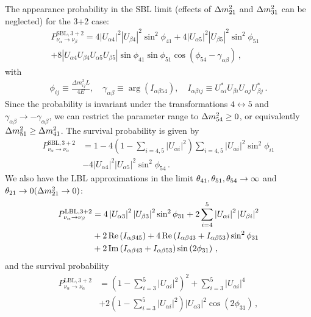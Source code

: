 \documentclass[twocolumn]{article}
\renewcommand{\a}{\ensuremath{\alpha}}
\renewcommand{\b}{\ensuremath{\beta}}
\renewcommand{\th}[1][]{%
  \theta\ifx\\#1\\\else_\text{#1}\fi
}
\newcommand*{\dm}[1][]{%
  \Delta m^2\ifx\\#1\\\else_\text{#1}\fi
}
\begin{document}
The appearance probability in the SBL limit (effects of $\dm[21]$ and $\dm[31]$ can be neglected) for the 3+2 case:
\begin{align*}
  P_{\nu_{\alpha} \rightarrow \nu_{\beta}}^{\mathrm{SBL}, 3+2}=4\left|U_{\alpha 4}\right|^{2}\left|U_{\beta 4}\right|^{2} \sin ^{2} \phi_{41}+4\left|U_{\alpha 5}\right|^{2}\left|U_{\beta 5}\right|^{2} \sin ^{2} \phi_{51} & \\
  +8\left|U_{\alpha 4} U_{\beta 4} U_{\alpha 5} U_{\beta 5}\right| \sin \phi_{41} \sin \phi_{51} \cos \left(\phi_{54}-\gamma_{\alpha \beta}\right)
\,,\end{align*}
with 
\begin{align*}
  \phi_{i j} \equiv \frac{\Delta m_{i j}^{2} L}{4 E}, \quad \gamma_{\alpha \beta} \equiv \arg \left(I_{\alpha \beta 54}\right), \quad I_{\alpha \beta i j} \equiv U_{\alpha i}^{*} U_{\beta i} U_{\alpha j} U_{\beta j}^{*}
\,.\end{align*}
Since the probability is invariant under the transformations $4 \leftrightarrow 5$ and $\gamma_{\a \b} \to -\gamma_{\a \b}$, we can restrict the parameter range to $\dm[54] \ge 0$, or equivalently $\dm[51] \ge \dm[41]$. 
The survival probability is given by
\begin{align*}
  P_{\nu_{\alpha} \rightarrow \nu_{\alpha}}^{\mathrm{SBL}, 3+2}
  &=1-4\left(1-\sum_{i=4,5}\left|U_{\alpha i}\right|^{2}\right) \sum_{i=4,5}\left|U_{\alpha i}\right|^{2} \sin ^{2} \phi_{i 1} \\
  &-4\left|U_{\alpha 4}\right|^{2}\left|U_{\alpha 5}\right|^{2} \sin ^{2} \phi_{54}
\,.\end{align*}
We also have the LBL approximations in the limit $\th[41], \th[51], \th[54] \to \infty$ and $\th[21] \to 0 (\dm[21] \to 0)$:
\begin{align*}
  P_{\nu_{\alpha} \rightarrow \nu_{\beta}}^{\mathrm{LBL}, 3+2}
  &= 4\left|U_{\alpha 3}\right|^{2} \abs{U_{\beta 3}}^{2} \sin ^{2} \phi_{31}+2 \sum_{i=4}^{5}\left|U_{\alpha i}\right|^{2}\left|U_{\beta i}\right|^{2}\\
  &+2 \operatorname{Re}\left(I_{\alpha \beta 45}\right)+4 \operatorname{Re}\left(I_{\alpha \beta 43}+I_{\alpha \beta 53}\right) \sin ^{2} \phi_{31} \\
  &+2 \operatorname{Im}\left(I_{\alpha \beta 43}+I_{\alpha \beta 53}\right) \sin \left(2 \phi_{31}\right)
\,,\end{align*}
and the survival probability
\begin{align*}
  P_{\nu_{\alpha} \rightarrow \nu_{\alpha}}^{\mathrm{LBL}, 3+2}
  &= \left(1-\sum_{i=3}^{5}\left|U_{\alpha i}\right|^{2}\right)^{2}+\sum_{i=3}^{5}\left|U_{\alpha i}\right|^{4} \\
  &+2\left(1-\sum_{i=3}^{5}\left|U_{\alpha i}\right|^{2}\right)\left|U_{\alpha 3}\right|^{2} \cos \left(2 \phi_{31}\right)
\,,\end{align*}
\end{document}
